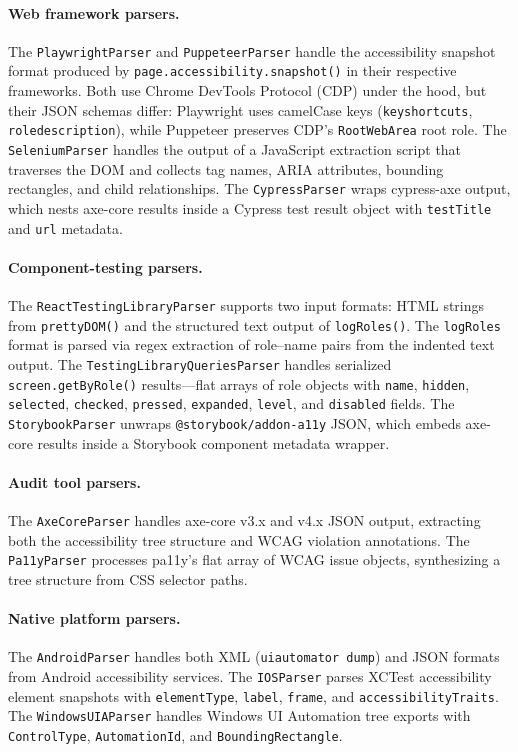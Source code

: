 \documentclass[11pt,twocolumn]{article}
\theoremstyle{definition}
\begin{document}
\paragraph{Web framework parsers.}
The \texttt{PlaywrightParser} and \texttt{PuppeteerParser} handle the accessibility snapshot format produced by \texttt{page.accessibility.snapshot()} in their respective frameworks.
Both use Chrome DevTools Protocol (CDP) under the hood, but their JSON schemas differ: Playwright uses camelCase keys (\texttt{keyshortcuts}, \texttt{roledescription}), while Puppeteer preserves CDP's \texttt{RootWebArea} root role.
The \texttt{SeleniumParser} handles the output of a JavaScript extraction script that traverses the DOM and collects tag names, ARIA attributes, bounding rectangles, and child relationships.
The \texttt{CypressParser} wraps cypress-axe output, which nests axe-core results inside a Cypress test result object with \texttt{testTitle} and \texttt{url} metadata.

\paragraph{Component-testing parsers.}
The \texttt{ReactTestingLibraryParser} supports two input formats: HTML strings from \texttt{prettyDOM()} and the structured text output of \texttt{logRoles()}.
The \texttt{logRoles} format is parsed via regex extraction of role--name pairs from the indented text output.
The \texttt{TestingLibraryQueriesParser} handles serialized \texttt{screen.getByRole()} results---flat arrays of role objects with \texttt{name}, \texttt{hidden}, \texttt{selected}, \texttt{checked}, \texttt{pressed}, \texttt{expanded}, \texttt{level}, and \texttt{disabled} fields.
The \texttt{StorybookParser} unwraps \texttt{@storybook/addon-a11y} JSON, which embeds axe-core results inside a Storybook component metadata wrapper.

\paragraph{Audit tool parsers.}
The \texttt{AxeCoreParser} handles axe-core v3.x and v4.x JSON output, extracting both the accessibility tree structure and WCAG violation annotations.
The \texttt{Pa11yParser} processes pa11y's flat array of WCAG issue objects, synthesizing a tree structure from CSS selector paths.

\paragraph{Native platform parsers.}
The \texttt{AndroidParser} handles both XML (\texttt{uiautomator dump}) and JSON formats from Android accessibility services.
The \texttt{IOSParser} parses XCTest accessibility element snapshots with \texttt{elementType}, \texttt{label}, \texttt{frame}, and \texttt{accessibilityTraits}.
The \texttt{WindowsUIAParser} handles Windows UI Automation tree exports with \texttt{ControlType}, \texttt{AutomationId}, and \texttt{BoundingRectangle}.
\end{document}
